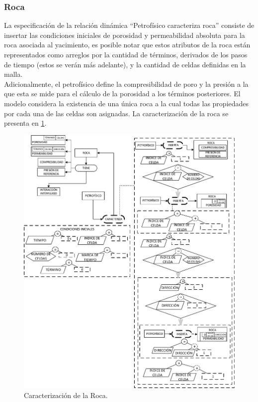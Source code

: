 
\subsubsection{Roca}\label{sec:PS_Rock}

La especificación de la relación dinámica ``Petrofísico caracteriza roca'' consiste de insertar las condiciones iniciales de porosidad y permeabilidad absoluta para la roca asociada al yacimiento, es posible notar que estos atributos de la roca están representados como arreglos por la cantidad de términos, derivados de los pasos de tiempo (estos se verán más adelante), y la cantidad de celdas definidas en la malla. \\
Adicionalmente, el petrofísico define la compresibilidad de poro y la presión a la que esta se mide para el cálculo de la porosidad a los términos posteriores. El modelo considera la existencia de una única roca a la cual todas las propiedades por cada una de las celdas son asignadas. La caracterización de la roca se presenta en \ref{fig:Rock}.\\

\begin{figure}[h]
	\centering%
	\includegraphics[width=0.90\linewidth]{Kap4/Rock.pdf}%
	\caption{Caracterización de la Roca.} \label{fig:Rock}
\end{figure}

